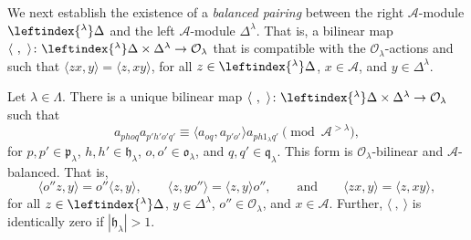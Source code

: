 \documentclass[a4paper,11pt]{amsart}
\let\<\langle
\let\>\rangle
\numberwithin{equation}{subsection}
\theoremstyle{definition}
\theoremstyle{theorem}
\theoremstyle{remark}
\newcommand\CA{\mathcal{A}}
\newcommand\CO{\mathcal{O}}
\newcommand\plam[1][\lambda]{\mathfrak{p}_{#1}}
\newcommand\hlam[1][\lambda]{\mathfrak{h}_{#1}}
\newcommand\qlam[1][\lambda]{\mathfrak{q}_{#1}}
\newcommand\Olam[1][\lambda]{\CO_{#1}}
\newcommand\olam[1][\lambda]{\mathfrak{o}_{#1}}
\begin{document}
  We next establish the existence of a \emph{balanced pairing} between the right
  $\CA$-module $\leftindex{^\lambda}\Delta$ and the left
  $\CA$-module $\Delta^\lambda$. That is, a bilinear map
  $\<\ ,\ \>\colon\leftindex{^\lambda}\Delta\times\Delta^\lambda\to\Olam$ that is
  compatible with the $\Olam$-actions and such that $\<zx,y\>=\<z,xy\>$,
  for all $z\in\leftindex{^\lambda}\Delta$, $x\in \CA$, and
  $y\in\Delta^\lambda$.

  \begin{Proposition}\label{L:Respectable}
     Let $\lambda\in\Lambda$. There is a unique bilinear map
    $\<\ ,\ \>\colon\leftindex{^\lambda}\Delta\times\Delta^\lambda\to\Olam$ such that
     \[
       a_{phoq}a_{p'h'o'q'}\equiv\<a_{oq},a_{p'o'}\>a_{ph1_\lambda q'}
            \pmod{\CA^{>\lambda}},
     \]
    for $p,p'\in\plam$, $h,h'\in\hlam$, $o,o'\in\olam$, and $q,q'\in\qlam$.
    This form is $\Olam$-bilinear and $\CA$-balanced. That is,
     \[
       \<o''z,y\>=o''\<z,y\>,\qquad
       \<z,yo''\>=\<z,y\>o'',\qquad\text{and}\qquad
       \<zx,y\>=\<z,xy\>,
     \]
    for all $z\in\leftindex{^\lambda}\Delta$, $y\in\Delta^\lambda$, $o''\in\Olam$, and $x\in\CA$.
    Further, $\<\ ,\ \>$ is identically zero if $|\hlam|>1$.
  \end{Proposition}
\end{document}
